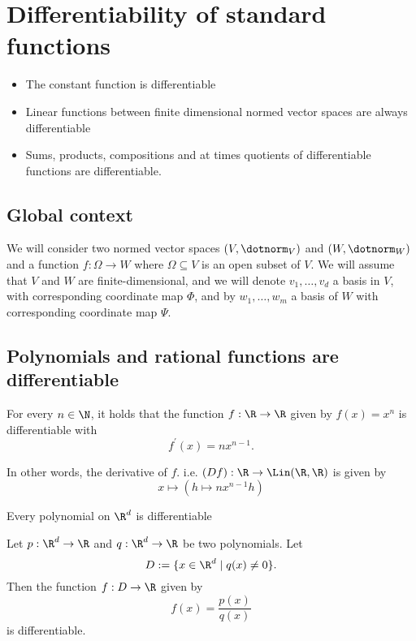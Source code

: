 \section{Differentiability of standard functions}

\begin{itemize}
    \item The constant function is differentiable
    \item Linear functions between finite dimensional normed vector spaces are always differentiable
    \item Sums, products, compositions and at times quotients of differentiable functions are differentiable.
\end{itemize}

\subsection{Global context}
We will consider two normed vector spaces $(V,\dotnorm_V)$ and $(W,\dotnorm_W)$ and a function $f:\Omega \to W$
where $\Omega \subseteq V$ is an open subset of $V$. We will assume that $V$ and $W$ are finite-dimensional, and
we will denote $v_1,\dots,v_d$ a basis in $V$, with corresponding coordinate map $\Phi$, and by $w_1,\dots,w_m$
a basis of $W$ with corresponding coordinate map $\Psi$.

\subsection{Polynomials and rational functions are differentiable}
\begin{proposition}
    For every $n \in \N$, it holds that the function $f: \R \to \R$ given by
    $f(x) = x^n$
    is differentiable with
    $$f^\prime(x) = nx^{n-1}.$$

    In other words, the derivative of $f$. i.e. $(Df): \R \to \Lin(\R,\R)$ is
    given by
    $$x \mapsto (h \mapsto nx^{n-1}h)$$
\end{proposition}

\begin{proposition}
    Every polynomial on $\R^d$ is differentiable
\end{proposition}

\begin{proposition}
    Let $p:\R^d \to \R$ and $q:\R^d \to \R$ be two polynomials. Let
    $$D:=\{x \in \R^d \mid q(x) \ne 0\}.$$
    Then the function $f:D \to \R$ given by
    $$f(x) = \frac{p(x)}{q(x)}$$
    is differentiable.
\end{proposition}

